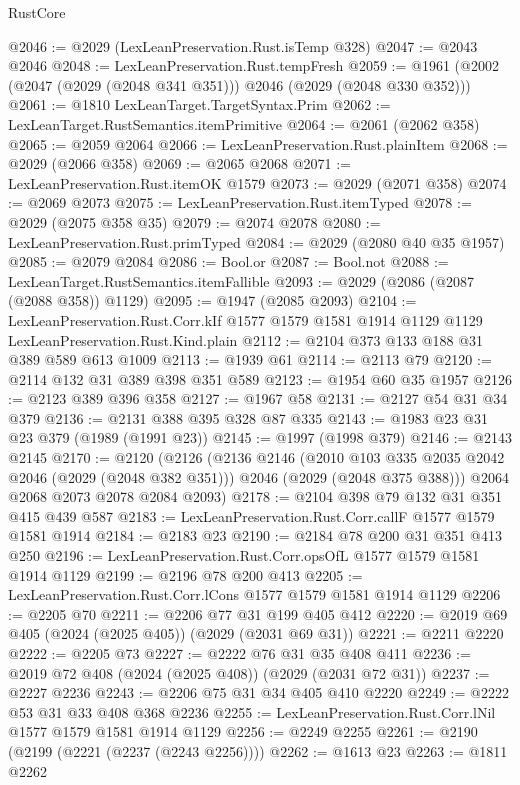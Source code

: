 \begin{lexlean}{RustCore}
\begin{coremodule}
@2046 := @2029 (LexLeanPreservation.Rust.isTemp @328)
@2047 := @2043 @2046
@2048 := LexLeanPreservation.Rust.tempFresh
@2059 := @1961 (@2002 (@2047 (@2029 (@2048 @341 @351))) @2046 (@2029 (@2048 @330 @352)))
@2061 := @1810 LexLeanTarget.TargetSyntax.Prim
@2062 := LexLeanTarget.RustSemantics.itemPrimitive
@2064 := @2061 (@2062 @358)
@2065 := @2059 @2064
@2066 := LexLeanPreservation.Rust.plainItem
@2068 := @2029 (@2066 @358)
@2069 := @2065 @2068
@2071 := LexLeanPreservation.Rust.itemOK @1579
@2073 := @2029 (@2071 @358)
@2074 := @2069 @2073
@2075 := LexLeanPreservation.Rust.itemTyped
@2078 := @2029 (@2075 @358 @35)
@2079 := @2074 @2078
@2080 := LexLeanPreservation.Rust.primTyped
@2084 := @2029 (@2080 @40 @35 @1957)
@2085 := @2079 @2084
@2086 := Bool.or
@2087 := Bool.not
@2088 := LexLeanTarget.RustSemantics.itemFallible
@2093 := @2029 (@2086 (@2087 (@2088 @358)) @1129)
@2095 := @1947 (@2085 @2093)
@2104 := LexLeanPreservation.Rust.Corr.kIf
    @1577
    @1579
    @1581
    @1914
    @1129
    @1129
    LexLeanPreservation.Rust.Kind.plain
@2112 := @2104 @373 @133 @188 @31 @389 @589 @613 @1009
@2113 := @1939 @61
@2114 := @2113 @79
@2120 := @2114 @132 @31 @389 @398 @351 @589
@2123 := @1954 @60 @35 @1957
@2126 := @2123 @389 @396 @358
@2127 := @1967 @58
@2131 := @2127 @54 @31 @34 @379
@2136 := @2131 @388 @395 @328 @87 @335
@2143 := @1983 @23 @31 @23 @379 (@1989 (@1991 @23))
@2145 := @1997 (@1998 @379)
@2146 := @2143 @2145
@2170 := @2120
    (@2126
      (@2136
        @2146
        (@2010 @103 @335 @2035 @2042 @2046 (@2029 (@2048 @382 @351)))
        @2046
        (@2029 (@2048 @375 @388)))
      @2064
      @2068
      @2073
      @2078
      @2084
      @2093)
@2178 := @2104 @398 @79 @132 @31 @351 @415 @439 @587
@2183 := LexLeanPreservation.Rust.Corr.callF @1577 @1579 @1581 @1914
@2184 := @2183 @23
@2190 := @2184 @78 @200 @31 @351 @413 @250
@2196 := LexLeanPreservation.Rust.Corr.opsOfL @1577 @1579 @1581 @1914 @1129
@2199 := @2196 @78 @200 @413
@2205 := LexLeanPreservation.Rust.Corr.lCons @1577 @1579 @1581 @1914 @1129
@2206 := @2205 @70
@2211 := @2206 @77 @31 @199 @405 @412
@2220 := @2019 @69 @405 (@2024 (@2025 @405)) (@2029 (@2031 @69 @31))
@2221 := @2211 @2220
@2222 := @2205 @73
@2227 := @2222 @76 @31 @35 @408 @411
@2236 := @2019 @72 @408 (@2024 (@2025 @408)) (@2029 (@2031 @72 @31))
@2237 := @2227 @2236
@2243 := @2206 @75 @31 @34 @405 @410 @2220
@2249 := @2222 @53 @31 @33 @408 @368 @2236
@2255 := LexLeanPreservation.Rust.Corr.lNil @1577 @1579 @1581 @1914 @1129
@2256 := @2249 @2255
@2261 := @2190 (@2199 (@2221 (@2237 (@2243 @2256))))
@2262 := @1613 @23
@2263 := @1811 @2262

\end{coremodule}
\end{lexlean}
